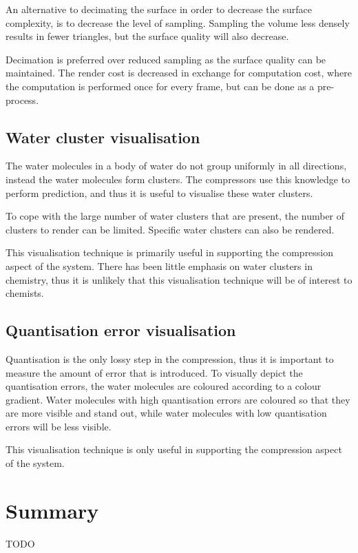 An alternative to decimating the surface in order to decrease the surface
complexity, is to decrease the level of sampling. Sampling the volume less
densely results in fewer triangles, but the surface quality will also decrease.

Decimation is preferred over reduced sampling as the surface quality can be
maintained. The render cost is decreased in exchange for computation cost,
where the computation is performed once for every frame, but can be done as a
pre-process.


\subsection{Water cluster visualisation}
\label{sub:design_watercluster}

The water molecules in a body of water do not group uniformly in all
directions, instead the water molecules form clusters. The compressors use this
knowledge to perform prediction, and thus it is useful to visualise these water
clusters.

To cope with the large number of water clusters that are present, the number of
clusters to render can be limited. Specific water clusters can also be rendered.

This visualisation technique is primarily useful in supporting the compression
aspect of the system. There has been little emphasis on water clusters in
chemistry, thus it is unlikely that this visualisation technique will be of
interest to chemists.


\subsection{Quantisation error visualisation}
\label{sub:design_quanterror}

Quantisation is the only lossy step in the compression, thus it is important to
measure the amount of error that is introduced. To visually depict the
quantisation errors, the water molecules are coloured according to a colour
gradient. Water molecules with high quantisation errors are coloured so that
they are more visible and stand out, while water molecules with low
quantisation errors will be less visible.

This visualisation technique is only useful in supporting the compression aspect
of the system.



\section{Summary}
\label{sec:design_summary}

TODO



